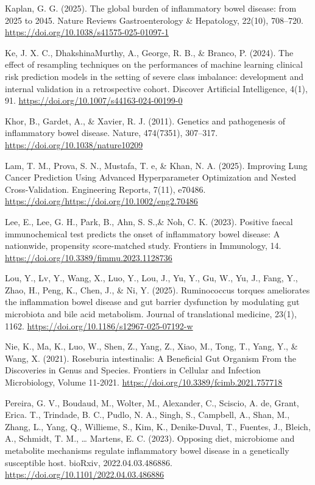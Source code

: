\documentclass[twoside,twocolumn,10pt]{article}
\begin{document}
\medskip
Kaplan, G. G. (2025). The global burden of inflammatory bowel disease: from 2025 to 2045. Nature Reviews Gastroenterology \& Hepatology, 22(10), 708–720. \url{https://doi.org/10.1038/s41575-025-01097-1}

\medskip
Ke, J. X. C., DhakshinaMurthy, A., George, R. B., \& Branco, P. (2024). The effect of resampling techniques on the performances of machine learning clinical risk prediction models in the setting of severe class imbalance: development and internal validation in a retrospective cohort. Discover Artificial Intelligence, 4(1), 91. \url{https://doi.org/10.1007/s44163-024-00199-0}

\medskip
Khor, B., Gardet, A., \& Xavier, R. J. (2011). Genetics and pathogenesis of inflammatory bowel disease. Nature, 474(7351), 307–317. \url{https://doi.org/10.1038/nature10209}

\medskip
Lam, T. M., Prova, S. N., Mustafa, T. e, \& Khan, N. A. (2025). Improving Lung Cancer Prediction Using Advanced Hyperparameter Optimization and Nested Cross-Validation. Engineering Reports, 7(11), e70486. \url{https://doi.org/https://doi.org/10.1002/eng2.70486}

\medskip
Lee, E., Lee, G. H., Park, B., Ahn, S. S.,\& Noh, C. K. (2023). Positive faecal immunochemical test predicts the onset of inflammatory bowel disease: A nationwide, propensity score-matched study. Frontiers in Immunology, 14. \url{https://doi.org/10.3389/fimmu.2023.1128736}

\medskip
Lou, Y., Lv, Y., Wang, X., Luo, Y., Lou, J., Yu, Y., Gu, W., Yu, J., Fang, Y., Zhao, H., Peng, K., Chen, J., \& Ni, Y. (2025). Ruminococcus torques ameliorates the inflammation bowel disease and gut barrier dysfunction by modulating gut microbiota and bile acid metabolism. Journal of translational medicine, 23(1), 1162. \url{https://doi.org/10.1186/s12967-025-07192-w}

\medskip
Nie, K., Ma, K., Luo, W., Shen, Z., Yang, Z., Xiao, M., Tong, T., Yang, Y., \& Wang, X. (2021). Roseburia intestinalis: A Beneficial Gut Organism From the Discoveries in Genus and Species. Frontiers in Cellular and Infection Microbiology, Volume 11-2021. \url{https://doi.org/10.3389/fcimb.2021.757718}

\medskip
Pereira, G. V., Boudaud, M., Wolter, M., Alexander, C., Sciscio, A. de, Grant, Erica. T., Trindade, B. C., Pudlo, N. A., Singh, S., Campbell, A., Shan, M., Zhang, L., Yang, Q., Willieme, S., Kim, K., Denike-Duval, T., Fuentes, J., Bleich, A., Schmidt, T. M., … Martens, E. C. (2023). Opposing diet, microbiome and metabolite mechanisms regulate inflammatory bowel disease in a genetically susceptible host. bioRxiv, 2022.04.03.486886. \url{https://doi.org/10.1101/2022.04.03.486886}
\end{document}
